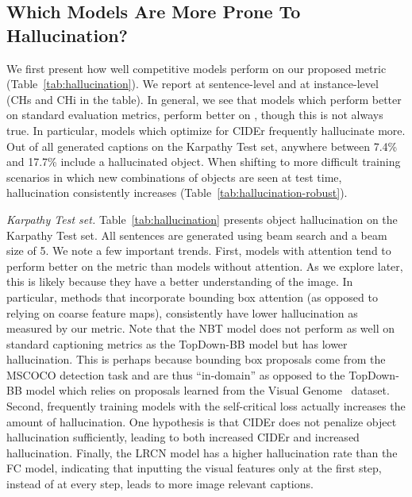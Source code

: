 %
\subsection{Which Models Are More Prone To Hallucination?}
\label{sec:sota_hallucination}

We first present how well competitive models perform on our proposed \metric{} metric (Table~\ref{tab:hallucination}). We report \metric{}  at sentence-level and at instance-level (CHs and CHi in the table).
In general, we see that models which perform better on standard evaluation metrics, perform better on \metric{}, though this is not always true.
In particular, models which optimize for CIDEr frequently hallucinate more.
Out of all generated captions on the Karpathy Test set, anywhere between 7.4\% and 17.7\% include a hallucinated object.
When shifting to more difficult training scenarios in which new combinations of objects are seen at test time, hallucination consistently increases (Table~\ref{tab:hallucination-robust}).

%


\textit{Karpathy Test set.}  Table~\ref{tab:hallucination} presents object hallucination 
%
on the Karpathy Test set.
All sentences are generated using beam search and a beam size of 5.
We note a few important trends. First, models with attention tend to perform better on the \metric{} metric than models without attention.
As we explore later, this is likely because they have a better understanding of the image.
In particular, methods that incorporate bounding box attention (as opposed to relying on coarse feature maps), consistently have lower hallucination as measured by our \metric{} metric.
Note that the NBT model does not perform as well on standard captioning metrics as the TopDown-BB model but has lower hallucination.
This is perhaps because bounding box proposals come from the MSCOCO detection task and are thus ``in-domain'' as opposed to the TopDown-BB model which relies on proposals learned from the Visual Genome~\cite{krishna2017visual} dataset.
Second, frequently training models with the self-critical loss actually increases the amount of hallucination. One hypothesis is that CIDEr does not penalize object hallucination sufficiently, leading to both increased CIDEr and increased hallucination.
Finally, the LRCN model has a higher hallucination rate than the FC model, indicating that inputting the visual features only at the first step, instead of at every step, leads to more image relevant captions.

